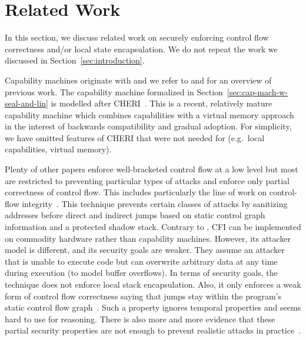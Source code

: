 \documentclass[acmsmall,screen]{acmart}\settopmatter{}
\begin{document}
\section{Related Work}

In this section, we discuss related work on securely enforcing control flow correctness and/or local state encapsulation.
We do not repeat the work we discussed in Section~\ref{sec:introduction}.

Capability machines originate with \citet{dennis_programming_1966} and we refer to \citet{levy_capability-based_1984} and \citet{watson_cheri:_2015} for an overview of previous work.
The capability machine formalized in Section~\ref{sec:cap-mach-w-seal-and-lin} is modelled after CHERI~\citep{watson_cheri:_2015,woodruff_cheri_2014}.
This is a recent, relatively mature capability machine which combines capabilities with a virtual memory approach in the interest of backwards compatibility and gradual adoption.
For simplicity, we have omitted features of CHERI that were not needed for \stktokens{} (e.g.\ local capabilities, virtual memory).

Plenty of other papers enforce well-bracketed control flow at a low level but most are restricted to preventing particular types of attacks and enforce only partial correctness of control flow.
This includes particularly the line of work on control-flow integrity~\citep{abadi_control-flow_2005}.
This technique prevents certain classes of attacks by sanitizing addresses before direct and indirect jumps based on static control graph information and a protected shadow stack.
Contrary to \stktokens{}, CFI can be implemented on commodity hardware rather than capability machines.
However, its attacker model is different, and its security goals are weaker.
They assume an attacker that is unable to execute code but can overwrite arbitrary data at any time during execution (to model buffer overflows).
In terms of security goals, the technique does not enforce local stack encapsulation.
Also, it only enforces a weak form of control flow correctness saying that jumps stay within the program's static control flow graph~\cite{Abadi2005Theory}.
Such a property ignores temporal properties and seems hard to use for reasoning.
There is also more and more evidence that these partial security properties are not enough to prevent realistic attacks in practice~\citep{Evans:2015:CJW:2810103.2813646,Carlini2015ControlFlowBending}.
\end{document}
